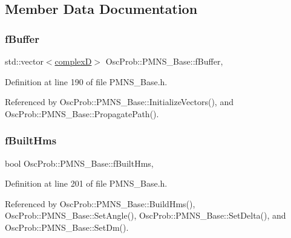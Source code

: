 \subsection{Member Data Documentation}
\mbox{\label{classOscProb_1_1PMNS__Base_a5440bc3efa466a37649601abce559e3e}} 
\subsubsection{\texorpdfstring{f\+Buffer}{fBuffer}}
{\footnotesize\ttfamily std\+::vector$<$\hyperlink{EigenPoint_8h_a67ca8e107e20610c3fff78d5e726ece0}{complexD}$>$ Osc\+Prob\+::\+P\+M\+N\+S\+\_\+\+Base\+::f\+Buffer\hspace{0.3cm}{\ttfamily [protected]}, {\ttfamily [inherited]}}



Definition at line 190 of file P\+M\+N\+S\+\_\+\+Base.\+h.



Referenced by Osc\+Prob\+::\+P\+M\+N\+S\+\_\+\+Base\+::\+Initialize\+Vectors(), and Osc\+Prob\+::\+P\+M\+N\+S\+\_\+\+Base\+::\+Propagate\+Path().

\mbox{\label{classOscProb_1_1PMNS__Base_a9ac3cadeac8db1b90f3152f476244780}} 
\subsubsection{\texorpdfstring{f\+Built\+Hms}{fBuiltHms}}
{\footnotesize\ttfamily bool Osc\+Prob\+::\+P\+M\+N\+S\+\_\+\+Base\+::f\+Built\+Hms\hspace{0.3cm}{\ttfamily [protected]}, {\ttfamily [inherited]}}



Definition at line 201 of file P\+M\+N\+S\+\_\+\+Base.\+h.



Referenced by Osc\+Prob\+::\+P\+M\+N\+S\+\_\+\+Base\+::\+Build\+Hms(), Osc\+Prob\+::\+P\+M\+N\+S\+\_\+\+Base\+::\+Set\+Angle(), Osc\+Prob\+::\+P\+M\+N\+S\+\_\+\+Base\+::\+Set\+Delta(), and Osc\+Prob\+::\+P\+M\+N\+S\+\_\+\+Base\+::\+Set\+Dm().

